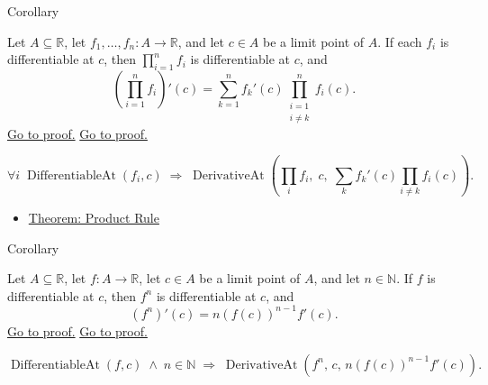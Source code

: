 \begin{corollarybox}{Corollary}
\begin{corollary}
\label{cor:extended-product-rule}
Let $A \subseteq \mathbb{R}$, let $f_1, \dots, f_n : A \to \mathbb{R}$, and let $c \in A$ be a limit point of $A$. If each $f_i$ is differentiable at $c$, then $\prod_{i=1}^{n} f_i$ is differentiable at $c$, and
\[
\left(\prod_{i=1}^{n} f_i\right)'(c)
=
\sum_{k=1}^{n}
f_k'(c) \prod_{\substack{i=1\\i\neq k}}^{n} f_i(c).
\]
\hyperref[prf:finite-product-rule]{Go to proof.}
\hyperref[prf:extended-product-rule]{Go to proof.}
\end{corollary}
\end{corollarybox}

\begin{remark*}
\[
\forall i\;\operatorname{DifferentiableAt}(f_i,c)
\;\Rightarrow\;
\operatorname{DerivativeAt}\!\left(\textstyle\prod_i f_i,\;c,\;\textstyle\sum_k f_k'(c)\prod_{i\neq k} f_i(c)\right).
\]
\end{remark*}

\begin{dependencies}
\begin{itemize}
  \item \hyperref[thm:product-rule]{Theorem: Product Rule}
\end{itemize}
\end{dependencies}


\begin{corollarybox}{Corollary}
\begin{corollary}
\label{cor:power-rule-special-case}
Let $A \subseteq \mathbb{R}$, let $f : A \to \mathbb{R}$, let $c \in A$ be a limit point of $A$, and let $n \in \mathbb{N}$. If $f$ is differentiable at $c$, then $f^n$ is differentiable at $c$, and
\[
(f^n)'(c) = n(f(c))^{n-1}f'(c).
\]
\hyperref[prf:special-case-product-rule]{Go to proof.}
\hyperref[prf:power-rule-special-case]{Go to proof.}
\end{corollary}
\end{corollarybox}

\begin{remark*}
\[
\operatorname{DifferentiableAt}(f,c) \;\land\; n \in \mathbb{N}
\;\Rightarrow\;
\operatorname{DerivativeAt}(f^n,\,c,\,n(f(c))^{n-1}f'(c)).
\]
\end{remark*}

